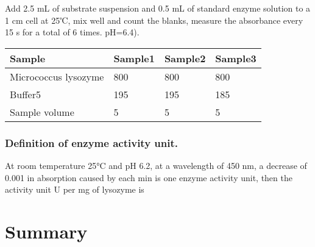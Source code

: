 Add 2.5 mL of substrate suspension and 0.5 mL of standard enzyme
solution to a 1 cm cell at 25℃, mix well and count the blanks, measure
the absorbance every 15 s for a total of 6 times. pH=6.4).

\begin{longtable}[]{@{}llll@{}}
	\toprule
	Sample & Sample1 & Sample2 & Sample3\tabularnewline
	\midrule
	\endhead
	Micrococcus lysozyme & 800 & 800 & 800\tabularnewline
	Buffer5 & 195 & 195 & 185\tabularnewline
	Sample volume & 5 & 5 & 5\tabularnewline
	\bottomrule
\end{longtable}

\subsubsection{Definition of enzyme activity unit.}

At room temperature 25°C and pH 6.2, at a wavelength of 450 nm, a
decrease of 0.001 in absorption caused by each min is one enzyme
activity unit, then the activity unit U per mg of lysozyme is


\section{Summary}

